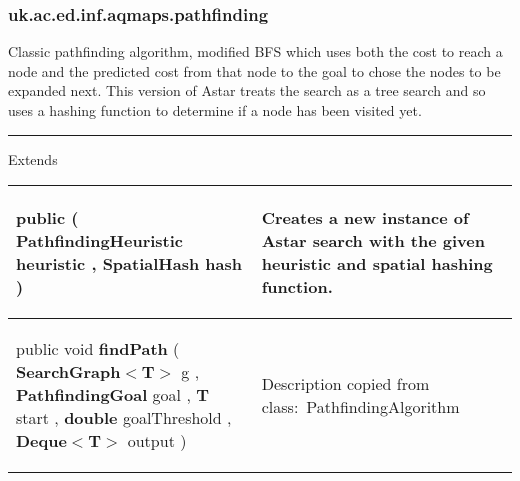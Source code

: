 \subsubsection*{ uk.ac.ed.inf.aqmaps.pathfinding }
 {\scriptsize Classic pathfinding algorithm, modified BFS which uses both the cost to reach a node and the predicted cost from that node to the goal\newline%
 to chose the nodes to be expanded next. This version of Astar treats the search as a tree search and so uses a hashing function to determine if a node has been visited yet.
 
\vspace*{4pt} \hrule \vspace*{3pt}
Extends \textbf{ \hyperref[tab:SearchNode]{\color{blue}{SearchNode}} }
\vspace*{-5pt} 
\begin{tabularx}{\linewidth}{m{}|m{}}
\label{tab:AstarTreeSearch}
\begin{raggedleft}public  \textbf{\hyperref[tab:AstarTreeSearch]{\color{blue}{AstarTreeSearch}} }(\newline \hfill 
\hspace*{ 5pt} \textbf{PathfindingHeuristic} heuristic , \newline
 \hspace*{ 5pt} \textbf{SpatialHash} hash  )
\end{raggedleft} &
 Creates a new instance of Astar search with the given heuristic and spatial hashing function.\\ \hline 
\begin{raggedleft}public void \textbf{findPath }(\newline \hfill 
\hspace*{ 5pt} \textbf{SearchGraph$<$T$>$} g , \newline
 \hspace*{ 5pt} \textbf{PathfindingGoal} goal , \newline
 \hspace*{ 5pt} \textbf{T} start , \newline
 \hspace*{ 5pt} \textbf{double} goalThreshold , \newline
 \hspace*{ 5pt} \textbf{Deque$<$T$>$} output  )
\end{raggedleft} &
 Description copied from class:~PathfindingAlgorithm\\\end{tabularx}
}
